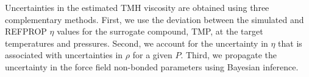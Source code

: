 \documentclass[11pt,a4paper]{article}
\begin{document}
	Uncertainties in the estimated TMH viscosity are obtained using three complementary methods. First, we use the deviation between the simulated and REFPROP $\eta$ values for the surrogate compound, TMP, at the target temperatures and pressures. Second, we account for the uncertainty in $\eta$ that is associated with uncertainties in $\rho$ for a given $P$. Third, we propagate the uncertainty in the force field non-bonded parameters using Bayesian inference. 
	
\end{document}
